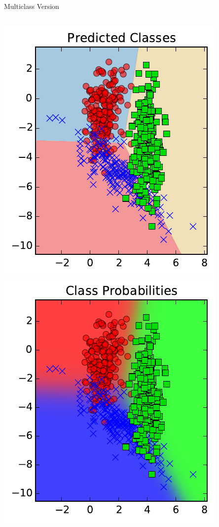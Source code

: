 \documentclass[10pt, aspectratio=169]{beamer} %
\begin{document}
\begin{frame}[fragile]{Multiclass Version }
\begin{columns}[onlytextwidth]
\begin{center}
	\includegraphics[width=\textwidth]{LR_3classes_stf.pdf}\\
	\includegraphics[width=\textwidth]{LR_3classes_prob_stf.pdf}\\
\end{center}
\end{columns}
\end{frame}
\end{document}
